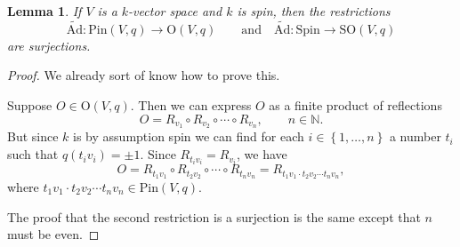 \documentclass[a4paper]{report}
\newcommand{\N}{\mathbb{N}}
\newcommand{\tAd}{\widetilde{\mathrm{Ad}}}
\newcommand{\Pin}{\mathrm{Pin}}
\newcommand{\Spin}{\mathrm{Spin}}
\newcommand{\Or}{\mathrm{O}}
\newcommand{\SO}{\mathrm{SO}}
\theoremstyle{definition}
\theoremstyle{plain}
\newtheorem{lemma}{Lemma}[section]
\theoremstyle{remark}
\begin{document}
\begin{lemma}
  If $V$ is a $k$-vector space and $k$ is spin, then the restrictions
  \begin{equation*}
    \tAd\colon \Pin(V, q) \to \Or(V, q)\qquad\text{and}\quad \tAd\colon \Spin \to \SO(V, q)
  \end{equation*}
  are surjections.
\end{lemma}
\begin{proof}
  We already sort of know how to prove this.

  Suppose $O \in \Or(V, q)$. Then we can express $O$ as a finite product of reflections
  \begin{equation*}
    O = R_{v_{1}} \circ R_{v_{2}} \circ \cdots \circ R_{v_{n}},\qquad n \in \N.
  \end{equation*} 
  But since $k$ is by assumption spin we can find for each $i \in \left\{ 1, \ldots, n \right\}$ a number $t_{i}$ such that $q(t_{i} v_{i}) = \pm 1$. Since $R_{t_{i} v_{i}} = R_{v_{i}}$, we have
  \begin{equation*}
    O = R_{t_{1} v_{1}} \circ R_{t_{2} v_{2}} \circ \cdots \circ R_{t_{n} v_{n}} = R_{t_{1} v_{1} \cdot t_{2} v_{2} \cdots t_{n} v_{n}},
  \end{equation*}
  where $t_{1} v_{1} \cdot t_{2} v_{2} \cdots t_{n} v_{n} \in \Pin(V, q)$.

  The proof that the second restriction is a surjection is the same except that $n$ must be even.
\end{proof}
\end{document}
